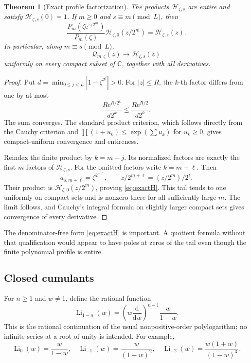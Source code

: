 \documentclass[11pt,letterpaper]{article}
\numberwithin{equation}{section}
\newtheorem{theorem}{Theorem}[section]
\theoremstyle{definition}
\theoremstyle{remark}
\newcommand{\C}{\mathbb C}
\newcommand{\Li}{\operatorname{Li}}
\newcommand{\Hp}{\mathcal H}
\newcommand{\Qp}{\mathcal Q}
\newcommand{\e}{\mathrm e}
\begin{document}
\begin{theorem}[Exact profile factorization]
\label{thm:profile}
The products \(\Hp_{\zeta,s}\) are entire and satisfy \(\Hp_{\zeta,s}(0)=1\). If \(m\geq0\) and \(s\equiv m\pmod L\), then
\begin{equation}
 \boxed{\quad
 \frac{P_m(\zeta\e^{z/2^m})}{P_m(\zeta)}
 \Hp_{\zeta,0}(z/2^m)=\Hp_{\zeta,s}(z).
 \quad}
 \label{eq:exactH}
\end{equation}
In particular, along \(m\equiv s\pmod L\),
\begin{equation}
 \Qp_{m,\zeta}(z)\longrightarrow\Hp_{\zeta,s}(z)
 \label{eq:Hlimit}
\end{equation}
uniformly on every compact subset of \(\C\), together with all derivatives.
\end{theorem}
\begin{proof}
Put \(d=\min_{0\leq j<L}|1-\zeta^{2^j}|>0\). For \(|z|\leq R\), the \(k\)-th factor differs from one by at most
\begin{equation}
 \frac{R\e^{R/2^k}}{d2^k}\leq\frac{R\e^{R/2}}{d2^k}.
 \label{eq:factorbound}
\end{equation}
The sum converges. The standard product criterion, which follows directly from the Cauchy criterion and \(\prod(1+u_k)\leq\exp(\sum u_k)\) for \(u_k\geq0\), gives compact-uniform convergence and entireness.

Reindex the finite product by \(k=m-j\). Its normalized factors are exactly the first \(m\) factors of \(\Hp_{\zeta,s}\). For the omitted factors write \(k=m+\ell\). Then
\[
 a_{s,m+\ell}=\zeta^{2^{-\ell}},\qquad
 z/2^{m+\ell}=(z/2^m)/2^\ell.
\]
Their product is \(\Hp_{\zeta,0}(z/2^m)\), proving \eqref{eq:exactH}. This tail tends to one uniformly on compact sets and is nonzero there for all sufficiently large \(m\). The limit follows, and Cauchy's integral formula on slightly larger compact sets gives convergence of every derivative.
\end{proof}

The denominator-free form \eqref{eq:exactH} is important. A quotient formula without that qualification would appear to have poles at zeros of the tail even though the finite polynomial profile is entire.

\subsection{Closed cumulants}
For \(n\geq1\) and \(w\neq1\), define the rational function
\begin{equation}
 \Li_{1-n}(w)=\left(w\frac{\mathrm d}{\mathrm dw}\right)^{n-1}
                  \frac{w}{1-w}.
 \label{eq:Lirational}
\end{equation}
This is the rational continuation of the usual nonpositive-order polylogarithm; no infinite series at a root of unity is intended. For example,
\[
 \Li_0(w)=\frac{w}{1-w},\quad
 \Li_{-1}(w)=\frac{w}{(1-w)^2},\quad
 \Li_{-2}(w)=\frac{w(1+w)}{(1-w)^3}.
\]
\end{document}
